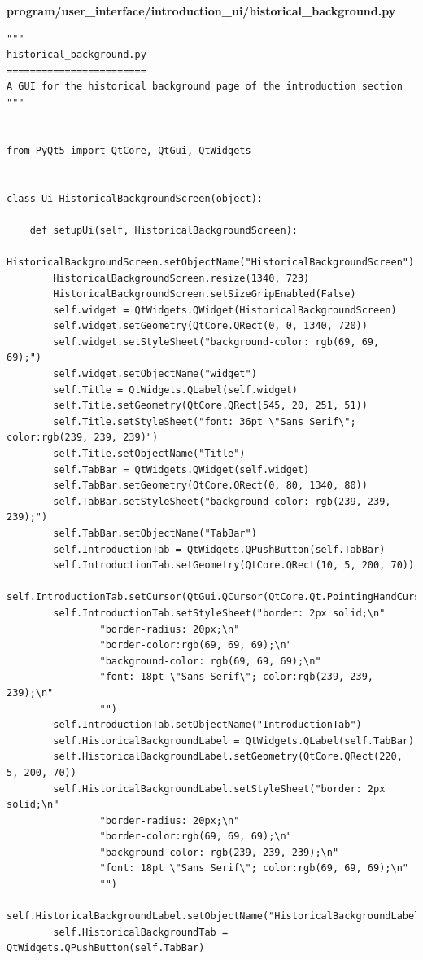 \documentclass[12pt]{article}
\begin{document}
\textbf{program/user\_interface/introduction\_ui/historical\_background.py}
\begin{lstlisting}
"""
historical_background.py
========================
A GUI for the historical background page of the introduction section
"""


from PyQt5 import QtCore, QtGui, QtWidgets


class Ui_HistoricalBackgroundScreen(object):

    def setupUi(self, HistoricalBackgroundScreen):
        HistoricalBackgroundScreen.setObjectName("HistoricalBackgroundScreen")
        HistoricalBackgroundScreen.resize(1340, 723)
        HistoricalBackgroundScreen.setSizeGripEnabled(False)
        self.widget = QtWidgets.QWidget(HistoricalBackgroundScreen)
        self.widget.setGeometry(QtCore.QRect(0, 0, 1340, 720))
        self.widget.setStyleSheet("background-color: rgb(69, 69, 69);")
        self.widget.setObjectName("widget")
        self.Title = QtWidgets.QLabel(self.widget)
        self.Title.setGeometry(QtCore.QRect(545, 20, 251, 51))
        self.Title.setStyleSheet("font: 36pt \"Sans Serif\"; color:rgb(239, 239, 239)")
        self.Title.setObjectName("Title")
        self.TabBar = QtWidgets.QWidget(self.widget)
        self.TabBar.setGeometry(QtCore.QRect(0, 80, 1340, 80))
        self.TabBar.setStyleSheet("background-color: rgb(239, 239, 239);")
        self.TabBar.setObjectName("TabBar")
        self.IntroductionTab = QtWidgets.QPushButton(self.TabBar)
        self.IntroductionTab.setGeometry(QtCore.QRect(10, 5, 200, 70))
        self.IntroductionTab.setCursor(QtGui.QCursor(QtCore.Qt.PointingHandCursor))
        self.IntroductionTab.setStyleSheet("border: 2px solid;\n"
                "border-radius: 20px;\n"
                "border-color:rgb(69, 69, 69);\n"
                "background-color: rgb(69, 69, 69);\n"
                "font: 18pt \"Sans Serif\"; color:rgb(239, 239, 239);\n"
                "")
        self.IntroductionTab.setObjectName("IntroductionTab")
        self.HistoricalBackgroundLabel = QtWidgets.QLabel(self.TabBar)
        self.HistoricalBackgroundLabel.setGeometry(QtCore.QRect(220, 5, 200, 70))
        self.HistoricalBackgroundLabel.setStyleSheet("border: 2px solid;\n"
                "border-radius: 20px;\n"
                "border-color:rgb(69, 69, 69);\n"
                "background-color: rgb(239, 239, 239);\n"
                "font: 18pt \"Sans Serif\"; color:rgb(69, 69, 69);\n"
                "")
        self.HistoricalBackgroundLabel.setObjectName("HistoricalBackgroundLabel")
        self.HistoricalBackgroundTab = QtWidgets.QPushButton(self.TabBar)

\end{lstlisting}
\end{document}
